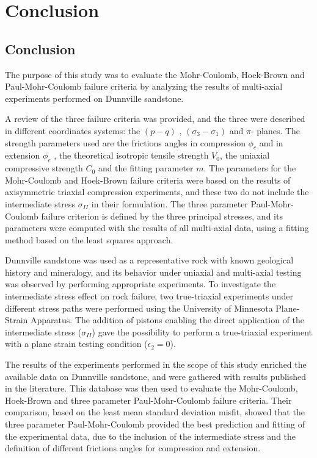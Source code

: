 \chapter{Conclusion}\label{ch6:chapter6}
\section{Conclusion}

The purpose of this study was to evaluate the Mohr-Coulomb, Hoek-Brown and Paul-Mohr-Coulomb failure criteria by analyzing the results of multi-axial experiments performed on Dunnville sandstone. 

A review of the three failure criteria was provided, and the three were described in different coordinates systems: the $(p-q)$ , $(\sigma_3-\sigma_1)$ and $\pi$- planes. The strength parameters used are the frictions angles in compression $\phi_c$ and in extension $\phi_e$ , the theoretical isotropic tensile strength $V_0$, the uniaxial compressive strength $C_0$ and the fitting parameter $m$. The parameters for the Mohr-Coulomb and Hoek-Brown failure criteria were based on the results of axisymmetric triaxial compression experiments, and these two  do not include the intermediate stress $\sigma_{II}$ in their formulation. The three parameter Paul-Mohr-Coulomb failure criterion is defined by the three principal stresses, and its parameters were computed with the results of all multi-axial data, using a fitting method based on the least squares approach.

Dunnville sandstone was used as a representative rock with known geological history and mineralogy, and its behavior under uniaxial and multi-axial testing was observed by performing appropriate experiments. To investigate the intermediate stress effect on rock failure, two true-triaxial experiments under different stress paths were performed using the University of Minnesota Plane-Strain Apparatus. The addition of pistons enabling the direct application of the intermediate stress ($\sigma_{II}$) gave the possibility to perform a true-triaxial experiment with a plane strain testing condition ($\epsilon_2=0$). 

The results of the experiments performed in the scope of this study enriched the available data on Dunnville sandstone, and were gathered with results published in the literature. This database was then used to evaluate the Mohr-Coulomb, Hoek-Brown and three parameter Paul-Mohr-Coulomb failure criteria. Their comparison, based on the least mean standard deviation misfit, showed that the three parameter Paul-Mohr-Coulomb provided the best prediction and fitting of the experimental data, due to the inclusion of the intermediate stress and the definition of different frictions angles for compression and extension. 

